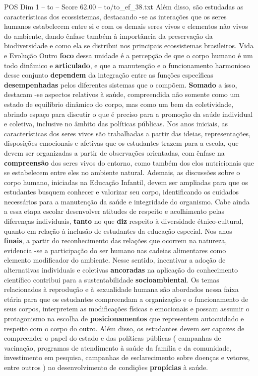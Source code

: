 \begin{textsample}{POS Dim 1 – to – Score 62.00 – to/to\_ef\_38.txt}
Além disso, são estudadas as características dos ecossistemas, destacando -se as interações que os seres humanos estabelecem entre si e com os demais seres vivos e elementos não vivos do ambiente, dando ênfase também à importância da preservação da biodiversidade e como ela se distribui nos principais ecossistemas brasileiros.
Vida e Evolução Outro \textbf{foco} dessa unidade é a percepção de que o corpo humano é um todo dinâmico e \textbf{articulado}, e que a manutenção e o funcionamento harmonioso desse conjunto \textbf{dependem} da integração entre as funções específicas \textbf{desempenhadas} pelos diferentes sistemas que o compõem. \textbf{Somado} a isso, destacam -se aspectos relativos à saúde, compreendida não somente como um estado de equilíbrio dinâmico do corpo, mas como um bem da coletividade, abrindo espaço para discutir o que é preciso para a promoção da saúde individual e coletiva, inclusive no âmbito das políticas públicas.
Nos anos iniciais, as características dos seres vivos são trabalhadas a partir das ideias, representações, disposições emocionais e afetivas que os estudantes trazem para a escola, que devem ser organizadas a partir de observações orientadas, com ênfase na \textbf{compreensão} dos seres vivos do entorno, como também dos elos nutricionais que se estabelecem entre eles no ambiente natural.
Ademais, as discussões sobre o corpo humano, iniciadas na Educação Infantil, devem ser ampliadas para que os estudantes busquem conhecer e valorizar seu corpo, identificando os cuidados necessários para a manutenção da saúde e integridade do organismo.
Cabe ainda a essa etapa escolar desenvolver atitudes de respeito e acolhimento pelas diferenças individuais, \textbf{tanto} no que \textbf{diz} respeito à diversidade étnico-cultural, quanto em relação à inclusão de estudantes da educação especial.
Nos anos \textbf{finais}, a partir do reconhecimento das relações que ocorrem na natureza, evidencia -se a participação do ser humano nas cadeias alimentares como elemento modificador do ambiente.
Nesse sentido, incentivar a adoção de alternativas individuais e coletivas \textbf{ancoradas} na aplicação do conhecimento científico contribui para a sustentabilidade \textbf{socioambiental}.
Os temas relacionados à reprodução e à sexualidade humana são abordados nessa faixa etária para que os estudantes compreendam a organização e o funcionamento de seus corpos, interpretem as modificações físicas e emocionais e possam assumir o protagonismo na escolha de \textbf{posicionamentos} que representem autocuidado e respeito com o corpo do outro.
Além disso, os estudantes devem ser capazes de compreender o papel do estado e das políticas públicas ( campanhas de vacinação, programas de atendimento à saúde da família e da comunidade, investimento em pesquisa, campanhas de esclarecimento sobre doenças e vetores, entre outros ) no desenvolvimento de condições \textbf{propícias} à saúde.

\end{textsample}
